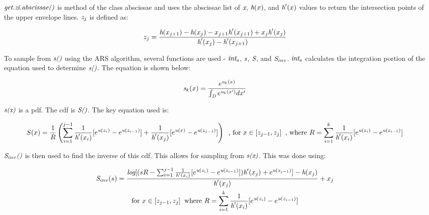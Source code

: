 \documentclass{article}\usepackage[]{graphicx}\usepackage[]{color}
\begin{document}
$\emph{get.zi.abscissae()}$ is method of the class abscissae and uses the abscissae list of $\emph{x}$, $\emph{h}(x)$, and $\emph{h}'(x)$ values to return the intersection points of the upper envelope lines.  $\emph{z}_{j}$ is defined as:

\begin{gather*}
z_{j} = \frac{\emph{h}(x_{j+1}) - \emph{h}(x_j) - x_{j+1}\emph{h}'(x_{j+1}) + x_{j}\emph{h}'(x_{j})}{\emph{h}'(x_{j}) - \emph{h}'(x_{j+1})}
\end{gather*}

To sample from $\emph{s()}$ using the ARS algorithm, several functions are used - $\emph{int}_s$, $\emph{s}$, $\emph{S}$, and $\emph{S}_{inv}$. $\emph{int}_s$ calculates the integration portion of the equation used to determine $\emph{s()}$. The equation is shown below:

\begin{gather*}
\emph{s}_{k}(x) = \frac{e^{\emph{u}_{k}(x)}}{\int_{\emph{D}} e^{\emph{u}_{k}(x')}dx'}
\end{gather*}

$\emph{s(x)}$ is a pdf. The cdf is $\emph{S()}$. The key equation used is:

\begin{gather*}
S(x) = \frac{1}{R} \left(\sum_{i=1}^{j-1} \frac{1}{\emph{h}'(x_{i})}[e^{\emph{u}(z_{i})} - e^{\emph{u}(z_{i-1})}] + \frac{1}{\emph{h}'(x_{j})}[e^{\emph{u}(x)} - e^{\emph{u}(z_{j-1})}]\right) \; \;
\text{, for } x \in [z_{j-1}, z_{j}] \; \;
\text{, where } R = \sum_{i=1}^{k}\frac{1}{\emph{h}'(x_{i})}[e^{\emph{u}(z_{i})} - e^{\emph{u}(z_{i-1})}]
\end{gather*}

$\emph{S}_{inv}\emph{()}$ is then used to find the inverse of this cdf.  This allows for sampling from $\emph{s(x)}$. This was done using:

\begin{gather*}
\emph{S}_{inv}(s) = \frac{\emph{log}[(sR - \sum_{i=1}^{j-1}\frac{1}{\emph{h}'(x_{i})}[e^{\emph{u}(z_{i})} - e^{\emph{u}(z_{i-1})}])\emph{h}'(x_{j}) + e^{\emph{u}(z_{j-1})}] - \emph{h}(x_{j})}{\emph{h}'(x_j)} + x_{j}\\
\text{for } x \in [z_{j-1}, z_{j}] \; \;
\text{where } R = \sum_{i=1}^{k}\frac{1}{\emph{h}'(x_{i})}[e^{\emph{u}(z_{i})} - e^{\emph{u}(z_{i-1})}]
\end{gather*}
\end{document}
